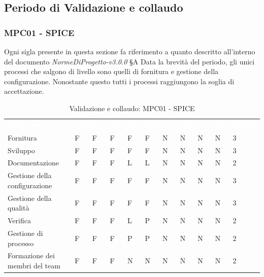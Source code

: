 \subsection{Periodo di Validazione e collaudo}
\subsubsection{MPC01 - SPICE}
Ogni sigla presente in questa sezione fa riferimento a quanto descritto all'interno del documento \textit{NormeDiProgetto-v3.0.0} §A\newline \newline
Data la brevità del periodo, gli unici processi che salgono di livello sono quelli di fornitura e gestione della configurazione. Nonostante questo tutti i processi raggiungono la soglia di accettazione.


\begin{table}[H]
        \renewcommand{\arraystretch}{1.5}
        \begin{tabular}{ m{}<{\centering}  m{}<{\centering} m{}<{\centering} m{}<{\centering} m{}<{\centering} m{}<{\centering} m{}<{\centering} m{}<{\centering} m{}<{\centering} m{}<{\centering} m{}<{\centering}}
	\rowcolor{darkblue}
	\textcolor{white}{\textbf{Processo}} &\textcolor{white}{\textbf{1.1}} &\textcolor{white}{\textbf{2.1}} &\textcolor{white}{\textbf{2.2}} &\textcolor{white}{\textbf{3.1}} &\textcolor{white}{\textbf{3.2}} &\textcolor{white}{\textbf{4.1}} &\textcolor{white}{\textbf{4.2}} &\textcolor{white}{\textbf{5.1}} &\textcolor{white}{\textbf{5.2}} &\textcolor{white}{\textbf{Livello}}\\ 


    Fornitura & F & F & F & F & F & N & N & N & N & 3 \\
    Sviluppo & F & F & F & F & F & N & N & N & N & 3 \\
    Documentazione & F & F & F & L & L & N & N & N & N & 2 \\
    Gestione della configurazione & F & F & F & F & F & N & N & N & N & 3 \\
    Gestione della qualità & F & F & F & F & F & N & N & N & N & 3 \\
    Verifica & F & F & F & L & P & N & N & N & N & 2 \\
   
    Gestione di processo & F & F & F & P & P & N & N & N & N & 2 \\
    Formazione dei membri del team & F & F & F & N & N & N & N & N & N & 2 \\
    
\end{tabular}       
\caption{Validazione e collaudo: MPC01 - SPICE}
\end{table}

